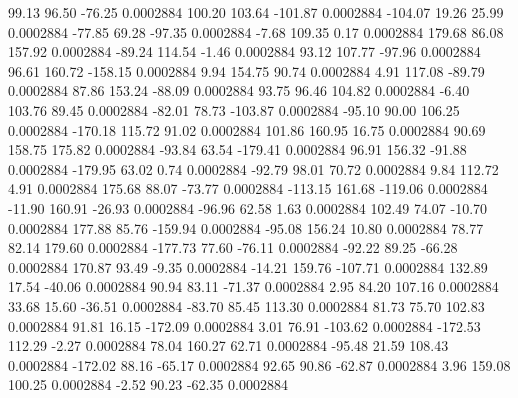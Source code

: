        99.13       96.50      -76.25     0.0002884
      100.20      103.64     -101.87     0.0002884
     -104.07       19.26       25.99     0.0002884
      -77.85       69.28      -97.35     0.0002884
       -7.68      109.35        0.17     0.0002884
      179.68       86.08      157.92     0.0002884
      -89.24      114.54       -1.46     0.0002884
       93.12      107.77      -97.96     0.0002884
       96.61      160.72     -158.15     0.0002884
        9.94      154.75       90.74     0.0002884
        4.91      117.08      -89.79     0.0002884
       87.86      153.24      -88.09     0.0002884
       93.75       96.46      104.82     0.0002884
       -6.40      103.76       89.45     0.0002884
      -82.01       78.73     -103.87     0.0002884
      -95.10       90.00      106.25     0.0002884
     -170.18      115.72       91.02     0.0002884
      101.86      160.95       16.75     0.0002884
       90.69      158.75      175.82     0.0002884
      -93.84       63.54     -179.41     0.0002884
       96.91      156.32      -91.88     0.0002884
     -179.95       63.02        0.74     0.0002884
      -92.79       98.01       70.72     0.0002884
        9.84      112.72        4.91     0.0002884
      175.68       88.07      -73.77     0.0002884
     -113.15      161.68     -119.06     0.0002884
      -11.90      160.91      -26.93     0.0002884
      -96.96       62.58        1.63     0.0002884
      102.49       74.07      -10.70     0.0002884
      177.88       85.76     -159.94     0.0002884
      -95.08      156.24       10.80     0.0002884
       78.77       82.14      179.60     0.0002884
     -177.73       77.60      -76.11     0.0002884
      -92.22       89.25      -66.28     0.0002884
      170.87       93.49       -9.35     0.0002884
      -14.21      159.76     -107.71     0.0002884
      132.89       17.54      -40.06     0.0002884
       90.94       83.11      -71.37     0.0002884
        2.95       84.20      107.16     0.0002884
       33.68       15.60      -36.51     0.0002884
      -83.70       85.45      113.30     0.0002884
       81.73       75.70      102.83     0.0002884
       91.81       16.15     -172.09     0.0002884
        3.01       76.91     -103.62     0.0002884
     -172.53      112.29       -2.27     0.0002884
       78.04      160.27       62.71     0.0002884
      -95.48       21.59      108.43     0.0002884
     -172.02       88.16      -65.17     0.0002884
       92.65       90.86      -62.87     0.0002884
        3.96      159.08      100.25     0.0002884
       -2.52       90.23      -62.35     0.0002884
